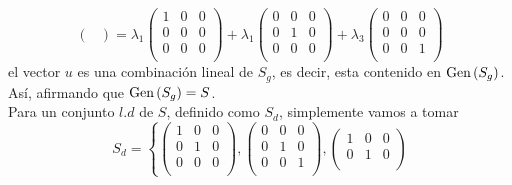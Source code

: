 \begin{enumerate}[label=\listAlph]
\[\begin{pmatrix}
                \end{pmatrix}
                =
                \lambda_1
                \begin{pmatrix}
                    1 & 0 & 0 \\
                    0 & 0 & 0 \\
                    0 & 0 & 0 \\
                \end{pmatrix}
                +
                \lambda_1
                \begin{pmatrix}
                    0 & 0 & 0 \\
                    0 & 1 & 0 \\
                    0 & 0 & 0 \\
                \end{pmatrix}
                +
                \lambda_3
                \begin{pmatrix}
                    0 & 0 & 0 \\
                    0 & 0 & 0 \\
                    0 & 0 & 1 \\
                \end{pmatrix}
            \]
            el vector \(u\) es una combinación lineal de \(S_g\), es decir, esta contenido en \(\text{Gen} \left( S_g \right)\). Así, afirmando que \(\text{Gen} \left( S_g \right) = S\).
            \\
            Para un conjunto \(l.d\) de \(S\), definido como \(S_d\), simplemente vamos a tomar
            \[
                S_d 
                =
                \left\{
                \begin{pmatrix}
                    1 & 0 & 0 \\
                    0 & 1 & 0 \\
                    0 & 0 & 0 \\
                \end{pmatrix},
                \begin{pmatrix}
                    0 & 0 & 0 \\
                    0 & 1 & 0 \\
                    0 & 0 & 1 \\
                \end{pmatrix},
                \begin{pmatrix}
                    1 & 0 & 0 \\
                    0 & 1 & 0 \\

\end{pmatrix}\]
\end{enumerate}
